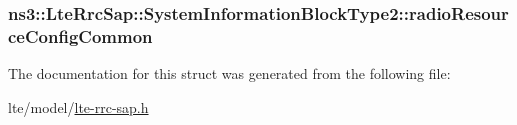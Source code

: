 \subsubsection[{\texorpdfstring{radio\+Resource\+Config\+Common}{radioResourceConfigCommon}}]{ ns3\+::\+Lte\+Rrc\+Sap\+::\+System\+Information\+Block\+Type2\+::radio\+Resource\+Config\+Common}\hypertarget{structns3_1_1LteRrcSap_1_1SystemInformationBlockType2_ae78bdbb96b0015be40a0e918215e61d4}{}\label{structns3_1_1LteRrcSap_1_1SystemInformationBlockType2_ae78bdbb96b0015be40a0e918215e61d4}


The documentation for this struct was generated from the following file\+:\begin{DoxyCompactItemize}
\item 
lte/model/\hyperlink{lte-rrc-sap_8h}{lte-\/rrc-\/sap.\+h}\end{DoxyCompactItemize}
